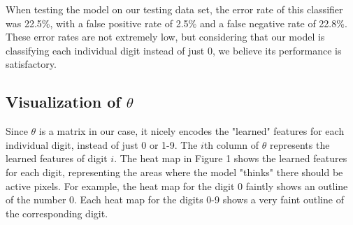 \documentclass[conference]{IEEEtran}
\begin{document}
When testing the model on our testing data set, the error rate of this classifier was 22.5\%, with a false positive rate of 2.5\% and a false negative rate of 22.8\%. These error rates are not extremely low, but considering that our model is classifying each individual digit instead of just 0, we believe its performance is satisfactory. 

\subsection{Visualization of $\theta$}
Since $\theta$ is a matrix in our case, it nicely encodes the "learned" features for each individual digit, instead of just 0 or 1-9. The $i$th column of $\theta$ represents the learned features of digit $i$.  The heat map in Figure 1 shows the learned features for each digit, representing the areas where the model "thinks" there should be active pixels. For example, the heat map for the digit 0 faintly shows an outline of the number 0. Each heat map for the digits 0-9 shows a very faint outline of the corresponding digit. 
\end{document}
